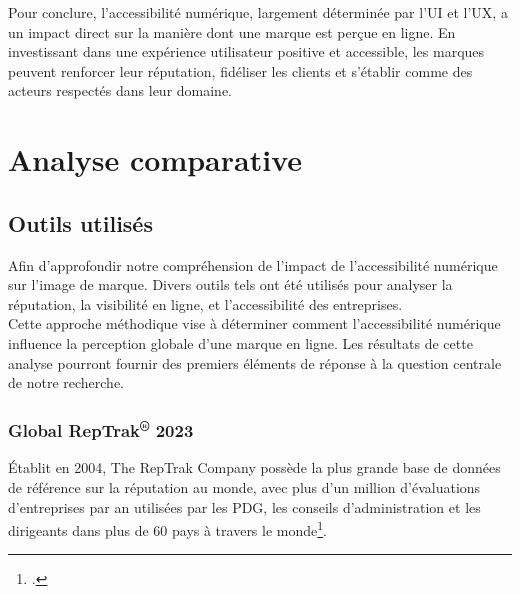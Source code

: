 \documentclass[12pt, a4paper]{report}
\begin{document}
Pour conclure, l'accessibilité numérique, largement déterminée par l'UI et l'UX, a un impact direct sur la manière dont une marque est perçue en ligne. En investissant dans une expérience utilisateur positive et accessible, les marques peuvent renforcer leur réputation, fidéliser les clients et s'établir comme des acteurs respectés dans leur domaine.

\chapter{Analyse comparative}

\section{Outils utilisés}

Afin d'approfondir notre compréhension de l'impact de l'accessibilité numérique sur l'image de marque. Divers outils tels ont été utilisés pour analyser la réputation, la visibilité en ligne, et l'accessibilité des entreprises.\\

Cette approche méthodique vise à déterminer comment l'accessibilité numérique influence la perception globale d'une marque en ligne. Les résultats de cette analyse pourront fournir des premiers éléments de réponse à la question centrale de notre recherche.




\subsection{Global RepTrak\textsuperscript{\tiny{®}} 2023}

Établit en 2004, The RepTrak Company possède la plus grande base de données de référence sur la réputation au monde, avec plus d'un million d'évaluations d'entreprises par an utilisées par les PDG, les conseils d'administration et les dirigeants dans plus de 60 pays à travers le monde\footcite{noauthor_reptrak_2023}.\\
\end{document}
